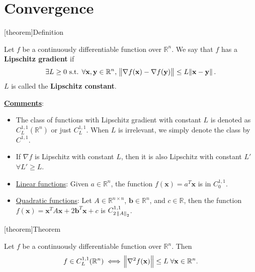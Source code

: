 \documentclass[12pt]{report}
\theoremstyle{definition}
\begin{document}
\section{Convergence}

[theorem]{Definition}
\begin{lipschitz gradient}
    Let $f$ be a continuously differentiable function over $\mathbb{R}^{n}$.
    We say that $f$ has a \textbf{Lipschitz gradient} if
    \[
        \exists L\ge 0\text{ s.t.
        }\forall\mathbf{x},\mathbf{y}\in\mathbb{R}^{n},\;
        \norm{\nabla f(\mathbf{x})-\nabla f(\mathbf{y})}\le
        L\norm{\mathbf{x}-\mathbf{y}}.
    \]
    $L$ is called the \textbf{Lipschitz constant}.
\end{lipschitz gradient}

\underline{\textbf{Comments}}:
\begin{itemize}
    \item The class of functions with Lipschitz gradient with constant $L$ 
        is denoted as $C_L^{1,1}(\mathbb{R}^{n})$ or just $C_L^{1,1}$.
        When $L$ is irrelevant, we simply denote the class by $C^{1,1}$.
    \item If $\nabla f$ is Lipschitz with constant $L$, then it is also
        Lipschitz with constant $L'$ $\forall L'\ge L$.
    \item \underline{Linear functions}: Given $a\in\mathbb{R}^{n}$, the function
        $f(\mathbf{x})=a^T\mathbf{x}$ is in $C_0^{1,1}$.
    \item \underline{Quadratic functions}: Let $A\in\mathbb{R}^{n\times n}$,
        $\mathbf{b}\in\mathbb{R}^{n}$, and $c\in\mathbb{R}$, then the function
        $f(\mathbf{x})=\mathbf{x}^TA\mathbf{x}+2\mathbf{b}^T\mathbf{x}+c$ is
        $C_{2\;\norm{A}_2}^{1,1}$.
\end{itemize} 

[theorem]{Theorem}
\begin{equivalence to boundedness of hessian}
    Let $f$ be a continuously differentiable function over $\mathbb{R}^{n}$.
    Then
    \[
        f\in C_L^{1,1}(\mathbb{R}^{n})
        \iff
        \norm{\nabla^2f(\mathbf{x})}\le L\;\forall \mathbf{x}\in\mathbb{R}^{n}.
    \]
\end{equivalence to boundedness of hessian}
\end{document}

